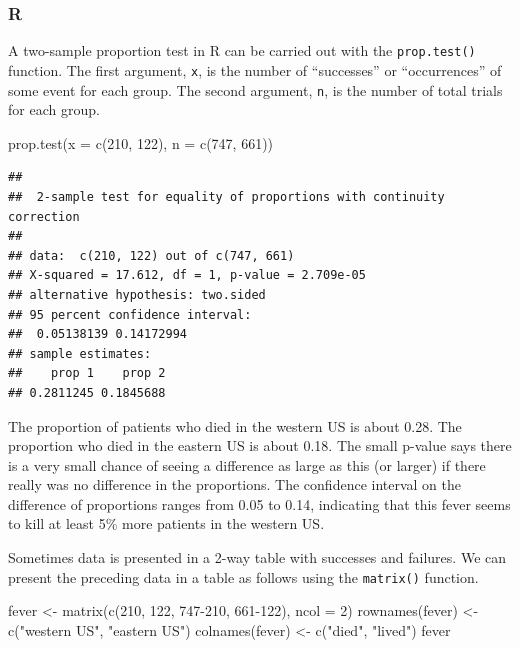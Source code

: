 \documentclass[
]{book}
\newenvironment{Shaded}{\begin{snugshade}}{\end{snugshade}}
\newcommand{\AttributeTok}[1]{\textcolor[rgb]{0.77,0.63,0.00}{#1}}
\newcommand{\DecValTok}[1]{\textcolor[rgb]{0.00,0.00,0.81}{#1}}
\newcommand{\FunctionTok}[1]{\textcolor[rgb]{0.00,0.00,0.00}{#1}}
\newcommand{\NormalTok}[1]{#1}
\newcommand{\OtherTok}[1]{\textcolor[rgb]{0.56,0.35,0.01}{#1}}
\newcommand{\StringTok}[1]{\textcolor[rgb]{0.31,0.60,0.02}{#1}}
\begin{document}
\hypertarget{r-48}{%
\subsubsection*{R}\label{r-48}}

A two-sample proportion test in R can be carried out with the \texttt{prop.test()} function. The first argument, \texttt{x}, is the number of ``successes'' or ``occurrences'' of some event for each group. The second argument, \texttt{n}, is the number of total trials for each group.

\begin{Shaded}
\begin{Highlighting}[]
\FunctionTok{prop.test}\NormalTok{(}\AttributeTok{x =} \FunctionTok{c}\NormalTok{(}\DecValTok{210}\NormalTok{, }\DecValTok{122}\NormalTok{), }\AttributeTok{n =} \FunctionTok{c}\NormalTok{(}\DecValTok{747}\NormalTok{, }\DecValTok{661}\NormalTok{))}
\end{Highlighting}
\end{Shaded}

\begin{verbatim}
## 
##  2-sample test for equality of proportions with continuity correction
## 
## data:  c(210, 122) out of c(747, 661)
## X-squared = 17.612, df = 1, p-value = 2.709e-05
## alternative hypothesis: two.sided
## 95 percent confidence interval:
##  0.05138139 0.14172994
## sample estimates:
##    prop 1    prop 2 
## 0.2811245 0.1845688
\end{verbatim}

The proportion of patients who died in the western US is about 0.28. The proportion who died in the eastern US is about 0.18. The small p-value says there is a very small chance of seeing a difference as large as this (or larger) if there really was no difference in the proportions. The confidence interval on the difference of proportions ranges from 0.05 to 0.14, indicating that this fever seems to kill at least 5\% more patients in the western US.

Sometimes data is presented in a 2-way table with successes and failures. We can present the preceding data in a table as follows using the \texttt{matrix()} function.

\begin{Shaded}
\begin{Highlighting}[]
\NormalTok{fever }\OtherTok{\textless{}{-}} \FunctionTok{matrix}\NormalTok{(}\FunctionTok{c}\NormalTok{(}\DecValTok{210}\NormalTok{, }\DecValTok{122}\NormalTok{,}
                  \DecValTok{747{-}210}\NormalTok{, }\DecValTok{661{-}122}\NormalTok{), }\AttributeTok{ncol =} \DecValTok{2}\NormalTok{)}
\FunctionTok{rownames}\NormalTok{(fever) }\OtherTok{\textless{}{-}} \FunctionTok{c}\NormalTok{(}\StringTok{"western US"}\NormalTok{, }\StringTok{"eastern US"}\NormalTok{)}
\FunctionTok{colnames}\NormalTok{(fever) }\OtherTok{\textless{}{-}} \FunctionTok{c}\NormalTok{(}\StringTok{"died"}\NormalTok{, }\StringTok{"lived"}\NormalTok{)}
\NormalTok{fever}
\end{Highlighting}
\end{Shaded}
\end{document}
